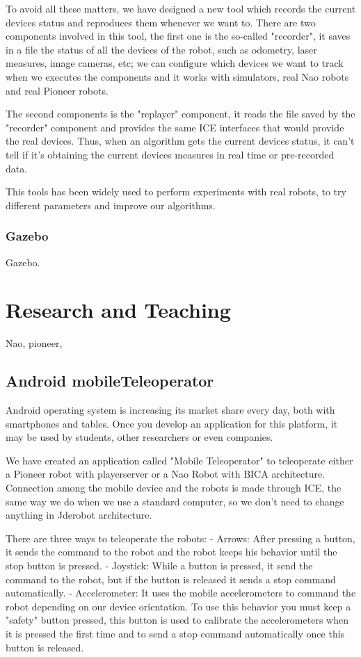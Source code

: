 \documentclass[twocolumn]{svjour3}          %
\begin{document}
To avoid all these matters, we have designed a new tool which records the current devices status and reproduces them whenever we want to. There are two components involved in this tool, the first one is the so-called "recorder", it saves in a file the status of all the devices of the robot, such as odometry, laser measures, image cameras, etc; we can configure which devices we want to track when we executes the components and it works with simulators, real Nao robots and real Pioneer robots.

The second components is the "replayer" component, it reads the file saved by the "recorder" component and provides the same ICE interfaces that would provide the real devices. Thus, when an algorithm gets the current devices status, it can't tell if it's obtaining the current devices measures in real time or pre-recorded data.

This tools has been widely used to perform experiments with real robots, to try different parameters and improve our algorithms.

\subsubsection{Gazebo}

Gazebo.

\section{Research and Teaching}
\label{ref:research}

Nao, pioneer,

\subsection{Android mobileTeleoperator}

Android operating system is increasing its market share every day, both with smartphones and tables. Once you develop an application for this platform, it may be used by students, other researchers or even companies. 

We have created an application called "Mobile Teleoperator" to teleoperate either a Pioneer robot with playerserver or a Nao Robot with BICA architecture. Connection among the mobile device and the robots is made through ICE, the same way we do when we use a standard computer, so we don't need to change anything in Jderobot architecture.

There are three ways to teleoperate the robots:
- Arrows: After pressing a button, it sends the command to the robot and the robot keeps his behavior until the stop button is pressed.
- Joystick: While a button is pressed, it send the command to the robot, but if the button is released it sends a stop command automatically.
- Accelerometer: It uses the mobile accelerometers to command the robot depending on our device orientation. To use this behavior you must keep a "safety" button pressed, this button is used to calibrate the accelerometers when it is pressed the first time and to send a stop command automatically once this button is released.
\end{document}
